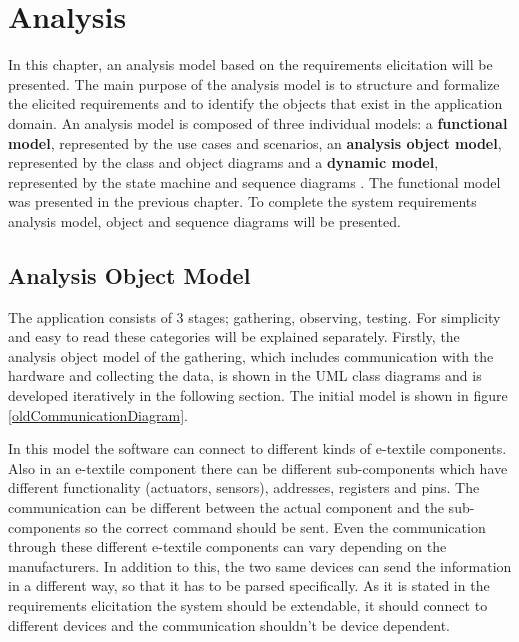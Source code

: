 \chapter{Analysis}

	In this chapter, an analysis model based on the requirements elicitation will be presented. The main purpose of the analysis model is to structure and formalize the elicited requirements and to identify the objects that exist in the application domain. An analysis model is composed of three individual models: a \textbf{functional model}, represented by the use cases and scenarios, an \textbf{analysis object model}, represented by the class and object diagrams and a \textbf{dynamic model}, represented by the state machine and sequence diagrams \cite{Bruegge2004}. The functional model was presented in the previous chapter. To complete the system requirements analysis model, object and sequence diagrams will be presented.

	
\section{Analysis Object Model}

	The application consists of 3 stages; gathering, observing, testing. For simplicity and easy to read these categories will be explained separately. Firstly, the analysis object model of the gathering, which includes communication with the hardware and collecting the data, is shown in the UML class diagrams and is developed iteratively in the following section. The initial model is shown in figure \ref{oldCommunicationDiagram}.




In this model the software can connect to different kinds of e-textile components. Also in an e-textile component there can be different sub-components which have different functionality (actuators, sensors), addresses, registers and pins. The communication can be different between the actual component and the sub-components so the correct command should be sent. Even the communication through these different e-textile components can vary depending on the manufacturers. In addition to this, the two same devices can send the information in a different way, so that it has to be parsed specifically. As it is stated in the requirements elicitation the system should be extendable, it should connect to different devices and the communication shouldn't be device dependent. \\

